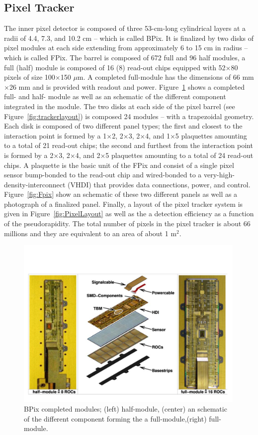 \subsection{Pixel Tracker}
The inner pixel detector is composed of three 53-cm-long cylindrical layers at a
radii of 4.4, 7.3, and 10.2 cm -- which is called BPix. It is finalized by two disks of pixel
modules at each side extending from approximately 6 to 15 cm in
radius -- which is called FPix. The barrel is composed of 672 full and 96 half modules, a full (half)
module is composed of 16 (8) read-out chips equipped with 52$\times$80 pixels
of size 100$\times$150 $\mu$m. A completed full-module has the
dimensions of 66 mm$\times$26 mm and is provided with readout and
power. Figure~\ref{fig:Bpix} shows a completed full- and half- module as
well as an schematic of the different component integrated in the
module. The two disks at each side of the pixel barrel (see
Figure~\ref{fig:trackerlayout}) is composed 24 modules -- with a
trapezoidal geometry. Each disk is composed of two different
panel types; the first and closest to the interaction point is formed
by a 1$\times$2, 2$\times$3, 2$\times$4, and 1$\times$5 plaquettes
amounting to a total of 21 read-out chips; the second and furthest from
the interaction point is formed by a 2$\times$3, 2$\times$4, and 2$\times$5 plaquettes
amounting to a total of 24 read-out chips. A plaquette is the basic
unit of the FPix and consist of a single pixel sensor bump-bonded to
the read-out chip and wired-bonded to a very-high-density-interconnect
(VHDI) that provides data connections, power, and
control. Figure~\ref{fig:Fpix} show an schematic of these two
different panels as well as a photograph of a finalized
panel. Finally, a layout of the pixel tracker system is given in
Figure~\ref{fig:PixelLayout} as well as the a detection efficiency as
a function of the pseudorapidity. The total number of pixels in the
pixel tracker is about 66 millions and they are equivalent to an area
of about 1 m$^2$.
\begin{figure}
 \centering
\includegraphics[width=0.99\textwidth]{CMS_DetectorFigures/BPixModule.pdf}
 \caption{BPix completed modules; (left) half-module, (center) an
   schematic of the different component forming the a full-module,(right) full-module.\label{fig:Bpix}}
\end{figure}
